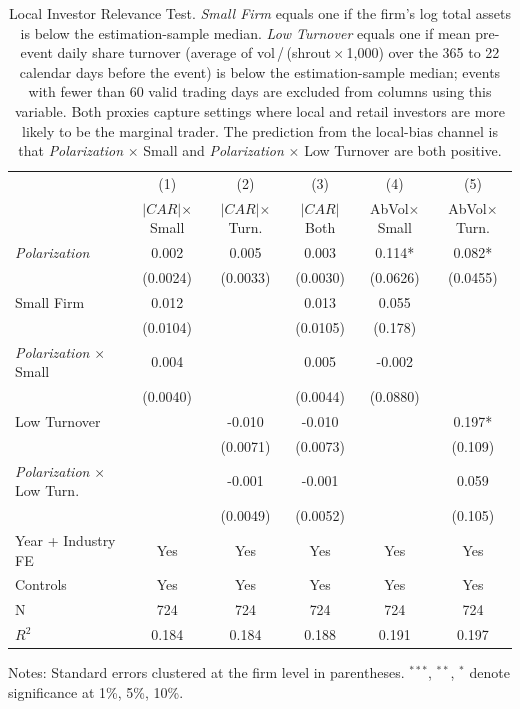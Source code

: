 \begin{table}[htbp]
\centering
\caption{Local Investor Relevance Test. \textit{Small Firm} equals one if the firm's log total assets is below the estimation-sample median. \textit{Low Turnover} equals one if mean pre-event daily share turnover (average of vol\,/\,(shrout\,$\times$\,1{,}000) over the 365 to 22 calendar days before the event) is below the estimation-sample median; events with fewer than 60 valid trading days are excluded from columns using this variable. Both proxies capture settings where local and retail investors are more likely to be the marginal trader. The prediction from the local-bias channel is that \textit{Polarization} $\times$ Small and \textit{Polarization} $\times$ Low Turnover are both positive.}
\label{tab:local_bias}
\begin{tabular}{lccccc}
\toprule
 & (1) & (2) & (3) & (4) & (5) \\
 & $|CAR|$\newline $\times$ Small & $|CAR|$\newline $\times$ Turn. & $|CAR|$\newline Both & AbVol\newline $\times$ Small & AbVol\newline $\times$ Turn. \\
\midrule
\textit{Polarization} & 0.002 & 0.005 & 0.003 & 0.114* & 0.082* \\
 & (0.0024) & (0.0033) & (0.0030) & (0.0626) & (0.0455) \\
Small Firm & 0.012 &  & 0.013 & 0.055 &  \\
 & (0.0104) &  & (0.0105) & (0.178) &  \\
\textit{Polarization} $\times$ Small & 0.004 &  & 0.005 & -0.002 &  \\
 & (0.0040) &  & (0.0044) & (0.0880) &  \\
Low Turnover &  & -0.010 & -0.010 &  & 0.197* \\
 &  & (0.0071) & (0.0073) &  & (0.109) \\
\textit{Polarization} $\times$ Low Turn. &  & -0.001 & -0.001 &  & 0.059 \\
 &  & (0.0049) & (0.0052) &  & (0.105) \\
\midrule
Year + Industry FE & Yes & Yes & Yes & Yes & Yes \\
Controls & Yes & Yes & Yes & Yes & Yes \\
N & 724 & 724 & 724 & 724 & 724 \\
$R^2$ & 0.184 & 0.184 & 0.188 & 0.191 & 0.197 \\
\bottomrule
\end{tabular}
\begin{flushleft}
\footnotesize Notes: Standard errors clustered at the firm level in parentheses. $^{***}$, $^{**}$, $^{*}$ denote significance at 1\%, 5\%, 10\%.
\end{flushleft}
\end{table}